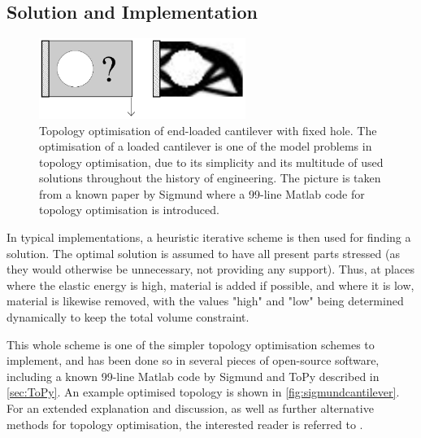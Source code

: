 \subsection{Solution and Implementation}
\begin{figure}
\centering
\includegraphics[width=0.6\textwidth]{Pictures/TopOp/Sigmund_cantilever2d.png}
\caption{Topology optimisation of end-loaded cantilever with fixed hole. The optimisation of a loaded cantilever is one of the model problems in topology optimisation, due to its simplicity and its multitude of used solutions throughout the history of engineering. The picture is taken from a known paper by Sigmund \cite{sigmund200199} where a 99-line Matlab code for topology optimisation is introduced.} 
\label{fig:sigmundcantilever}
\end{figure}
In typical implementations, a heuristic iterative scheme is then used for finding a solution. The optimal solution is assumed to have all present parts stressed (as they would otherwise be unnecessary, not providing any support). Thus, at places where the elastic energy is high, material is added if possible, and where it is low, material is likewise removed, with the values "high" and "low" being determined dynamically to keep the total volume constraint. 

This whole scheme is one of the simpler topology optimisation schemes to implement, and has been done so in several pieces of open-source software, including a known 99-line Matlab code by Sigmund \cite{sigmund200199} and ToPy described in \autoref{sec:ToPy}. An example optimised topology is shown in \autoref{fig:sigmundcantilever}. For an extended explanation and discussion, as well as further alternative methods for topology optimisation, the interested reader is referred to \cite{bendsoe2003topology}.

